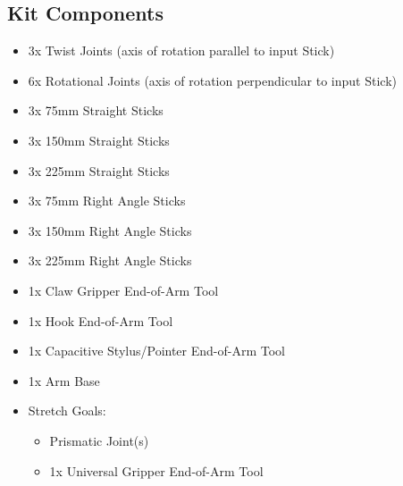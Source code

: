 \subsection{Kit Components}
\label{app:KitParts}
\begin{itemize}
	\item 3x Twist Joints (axis of rotation parallel to input Stick)
	\item 6x Rotational Joints (axis of rotation perpendicular to input Stick)
	\item 3x 75mm Straight Sticks
	\item 3x 150mm Straight Sticks
	\item 3x 225mm Straight Sticks
	\item 3x 75mm Right Angle Sticks
	\item 3x 150mm Right Angle Sticks
	\item 3x 225mm Right Angle Sticks
	\item 1x Claw Gripper End-of-Arm Tool
	\item 1x Hook End-of-Arm Tool
	\item 1x Capacitive Stylus/Pointer End-of-Arm Tool
	\item 1x Arm Base
	\item Stretch Goals:
	\begin{itemize}
		\item Prismatic Joint(s)
		\item 1x Universal Gripper End-of-Arm Tool
	\end{itemize}
\end{itemize}